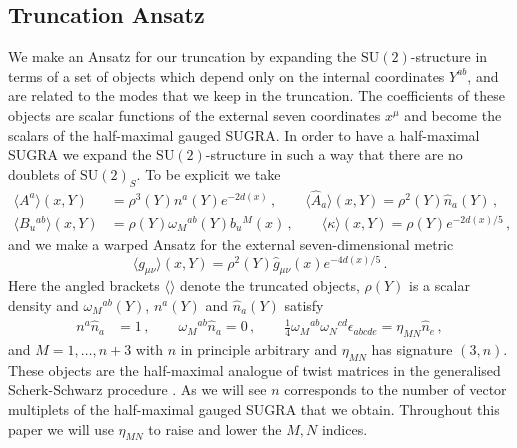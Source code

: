 \documentclass{PoS}
\newcommand{\SU}[1]{\mathrm{SU}( #1 )}
\begin{document}
\subsection{Truncation Ansatz}
We make an Ansatz for our truncation by expanding the $\SU{2}$-structure in terms of a set of objects which depend only on the internal coordinates $Y^{ab}$, and are related to the modes that we keep in the truncation. The coefficients of these objects are scalar functions of the external seven coordinates $x^\mu$ and become the scalars of the half-maximal gauged SUGRA. In order to have a half-maximal SUGRA we expand the $\SU{2}$-structure in such a way that there are no doublets of $\SU{2}_S$. To be explicit we take
\begin{equation}
 \begin{split}
  \langle A^a\rangle(x,Y) &= \rho^3(Y) n^a(Y) e^{-2d(x)} \,, \qquad \langle\hat{A}_a\rangle(x,Y) = \rho^2(Y) \hat{n}_a(Y) \,, \\
  \langle B_u{}^{ab}\rangle(x,Y) &= \rho(Y) \omega_M{}^{ab}(Y) b_u{}^M(x) \,, \qquad \langle\kappa\rangle(x,Y) = \rho(Y) e^{-2d(x)/5} \,, \label{eq:TruncationAnsatz}
 \end{split}
\end{equation}
and we make a warped Ansatz for the external seven-dimensional metric
\begin{equation}
 \langle g_{\mu\nu}\rangle(x,Y) = \rho^{2}(Y) \hat{g}_{\mu\nu}(x) e^{-4d(x)/5} \,.
\end{equation}
Here the angled brackets $\langle \rangle$ denote the truncated objects, $\rho(Y)$ is a scalar density and $\omega_M{}^{ab}(Y)$, $n^a(Y)$ and $\hat{n}_a(Y)$ satisfy
\begin{equation}
 \begin{split}
  n^a \hat{n}_a &= 1 \,, \qquad \omega_M{}^{ab} \hat{n}_a = 0 \,, \qquad \frac14 \omega_{M}{}^{ab} \omega_{N}{}^{cd} \epsilon_{abcde} = \eta_{MN} \hat{n}_e \,, \label{eq:ModeCompatibility}
 \end{split}
\end{equation}
and $M = 1, \ldots, n+3$ with $n$ in principle arbitrary and $\eta_{MN}$ has signature $\left(3, n\right)$. These objects are the half-maximal analogue of twist matrices in the generalised Scherk-Schwarz procedure \cite{Aldazabal:2011nj,Geissbuhler:2011mx,Grana:2012rr,Dibitetto:2012rk,Berman:2012uy,Hohm:2014qga,Lee:2014mla,Berman:2013uda,Blair:2014zba}. As we will see $n$ corresponds to the number of vector multiplets of the half-maximal gauged SUGRA that we obtain. Throughout this paper we will use $\eta_{MN}$ to raise and lower the $M, N$ indices.
\end{document}
